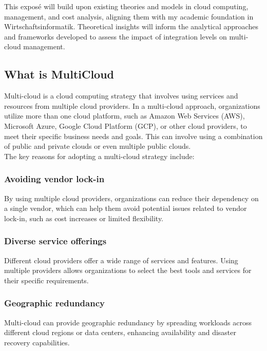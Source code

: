 This exposé will build upon existing theories and models in cloud computing, management, and cost analysis, 
aligning them with my academic foundation in Wirtschaftsinformatik. 
Theoretical insights will inform the analytical approaches and frameworks developed to assess the impact of integration levels on multi-cloud management.


\subsection{What is MultiCloud}

Multi-cloud is a cloud computing strategy that involves using services and resources from multiple cloud providers. 
In a multi-cloud approach, organizations utilize more than one cloud platform, such as Amazon Web Services (AWS), Microsoft Azure, Google Cloud Platform (GCP), 
or other cloud providers, to meet their specific business needs and goals. 
This can involve using a combination of public and private clouds or even multiple public clouds.\\
The key reasons for adopting a multi-cloud strategy include:

\subsubsection{Avoiding vendor lock-in}
By using multiple cloud providers, organizations can reduce their dependency on a single vendor, 
which can help them avoid potential issues related to vendor lock-in, such as cost increases or limited flexibility.

\subsubsection{Diverse service offerings} 
Different cloud providers offer a wide range of services and features. 
Using multiple providers allows organizations to select the best tools and services for their specific requirements.

\subsubsection{Geographic redundancy} 
Multi-cloud can provide geographic redundancy by spreading workloads across different cloud regions or data centers, 
enhancing availability and disaster recovery capabilities.

